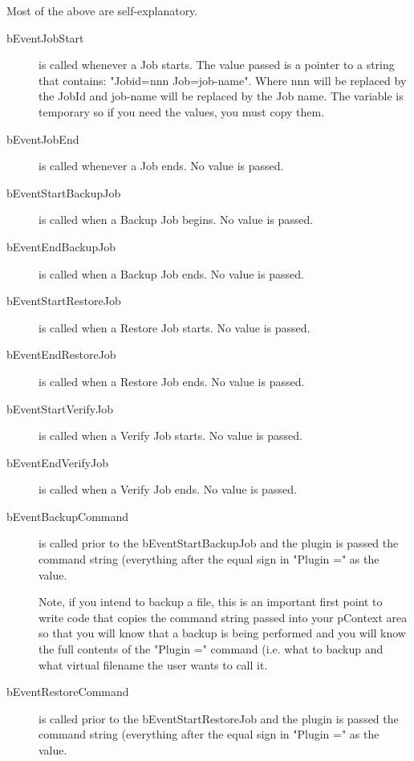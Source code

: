 Most of the above are self-explanatory.

\begin{description}
 \item [bEventJobStart] is called whenever a Job starts. The value
   passed is a pointer to a string that contains: "Jobid=nnn 
   Job=job-name". Where nnn will be replaced by the JobId and job-name
   will be replaced by the Job name. The variable is temporary so if you
   need the values, you must copy them.

 \item [bEventJobEnd] is called whenever a Job ends. No value is passed.

 \item [bEventStartBackupJob] is called when a Backup Job begins. No value
   is passed.

 \item [bEventEndBackupJob] is called when a Backup Job ends. No value is 
   passed.

 \item [bEventStartRestoreJob] is called when a Restore Job starts. No value
   is passed.

 \item [bEventEndRestoreJob] is called when a Restore Job ends. No value is
   passed.

 \item [bEventStartVerifyJob] is called when a Verify Job starts. No value
   is passed.

 \item [bEventEndVerifyJob] is called when a Verify Job ends. No value
   is passed.

 \item [bEventBackupCommand] is called prior to the bEventStartBackupJob and
   the plugin is passed the command string (everything after the equal sign
   in "Plugin =" as the value.

   Note, if you intend to backup a file, this is an important first point to
   write code that copies the command string passed into your pContext area
   so that you will know that a backup is being performed and you will know
   the full contents of the "Plugin =" command (i.e. what to backup and
   what virtual filename the user wants to call it.

 \item [bEventRestoreCommand] is called prior to the bEventStartRestoreJob and
   the plugin is passed the command string (everything after the equal sign
   in "Plugin =" as the value.


\end{description}
